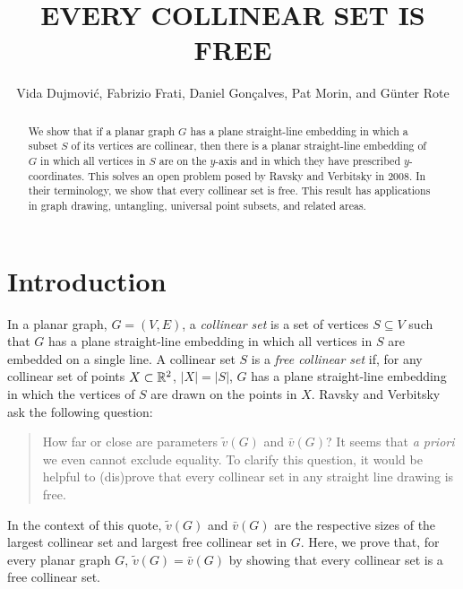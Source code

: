 \documentclass{patmorin}
\title{\MakeUppercase{Every Collinear Set is Free}}
\author{Vida Dujmović, Fabrizio Frati, Daniel Gonçalves, Pat Morin, and Günter Rote}
\begin{document}
\maketitle


\begin{abstract}
  We show that if a planar graph $G$ has a plane straight-line embedding
  in which a subset $S$ of its vertices are collinear, then there is a
  planar straight-line embedding of $G$ in which all vertices in $S$ are
  on the $y$-axis and in which they have prescribed $y$-coordinates.
  This solves an open problem posed by Ravsky and Verbitsky in 2008.
  In their terminology, we show that every collinear set is free.
  This result has applications in graph drawing, untangling, universal
  point subsets, and related areas.
\end{abstract}


\section{Introduction}

In a planar graph, $G=(V,E)$, a \emph{collinear set} is a set of vertices
$S\subseteq V$ such that $G$ has a plane straight-line embedding in which
all vertices in $S$ are embedded on a single line.  A collinear set $S$
is a \emph{free collinear set} if, for any collinear set of points
$X\subset\mathbb{R}^2$, $|X|=|S|$, $G$ has a plane straight-line embedding in
which the vertices of $S$ are drawn on the points in $X$.  Ravsky and
Verbitsky \cite{ravsky.verbitsky:on,ravsky.verbitsky:on-arxiv} ask the
following question:

\begin{quote}
   How far or close are parameters $\tilde{v}(G)$ and $\bar{v}(G)$? It
   seems that \emph{a priori} we even cannot exclude equality. To clarify
   this question, it would be helpful to (dis)prove that every collinear
   set in any straight line drawing is free.
\end{quote}

In the context of this quote, $\tilde{v}(G)$ and $\bar{v}(G)$ are
the respective sizes of the largest collinear set and largest free
collinear set in $G$.  Here, we prove that, for every planar graph $G$,
$\tilde{v}(G)=\bar{v}(G)$ by showing that every collinear set is a free
collinear set.
\end{document}
